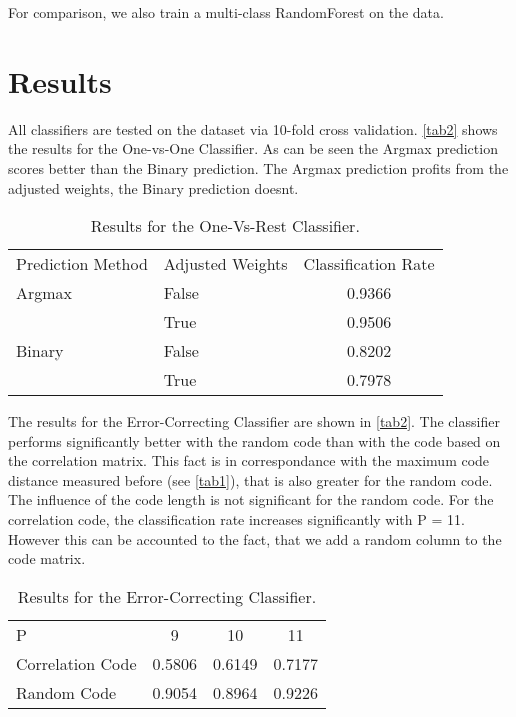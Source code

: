 \documentclass{article}
\begin{document}
For comparison, we also train a multi-class RandomForest on the data. 

\section{Results} \label{res} 

All classifiers are tested on the dataset via 10-fold cross validation.
\autoref{tab2} shows the results for the One-vs-One Classifier.
As can be seen the Argmax prediction scores better than the Binary prediction.
The Argmax prediction profits from the adjusted weights, the Binary prediction doesnt.

\begin{table}[h]
	\centering
	\begin{tabular}{l l c}
        Prediction Method   & Adjusted Weights  & Classification Rate   \\
        Argmax	            & False             &   0.9366 		        \\
                            & True              &   0.9506              \\
        Binary	            & False             &	0.8202              \\
                            & True              &   0.7978              \\
	\end{tabular}
	\caption{Results for the One-Vs-Rest Classifier.}
	\label{tab2}
\end{table}

The results for the Error-Correcting Classifier are shown in \autoref{tab2}.
The classifier performs significantly better with the random code than with the
code based on the correlation matrix.
This fact is in correspondance with the maximum code distance measured before 
(see \autoref{tab1}), that is also greater for the random code.
The influence of the code length is not significant for the random code.
For the correlation code, the classification rate increases significantly with P = 11.
However this can be accounted to the fact, that we add a random column to the code matrix.

\begin{table}[h]
	\centering
	\begin{tabular}{l c c c}
        P                   & 9     & 10    & 11    \\
        Correlation Code	& 0.5806&0.6149 &0.7177 \\         
        Random Code	        & 0.9054&0.8964 &0.9226 \\	
    \end{tabular}
	\caption{Results for the Error-Correcting Classifier.}
	\label{tab3}
\end{table}
\end{document}
